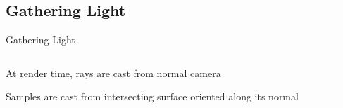 \documentclass[10pt,handout,compress,professionalfont]{beamer}
\begin{document}
\subsection{Gathering Light}
\begin{frame}{Gathering Light}

    \begin{columns}
        \begin{column}{0.5\textwidth}

    \vspace{-5mm}
    At render time, rays are cast from normal camera\\
    \vspace{8mm}

    Samples are cast from intersecting surface oriented along its normal

        \end{column}
        \begin{column}{0.5\textwidth}
            \includegraphics[width=\textwidth]{../img/diag/orthnormal.pdf}\\
            \vspace{-4mm}
        \end{column}
    \end{columns}

\end{frame}
\end{document}
